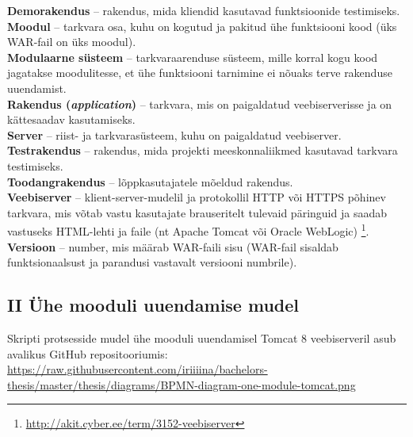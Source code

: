 \documentclass[12pt]{article}
\begin{document}
  \textbf{Demorakendus} \--- rakendus, mida kliendid kasutavad funktsioonide testimiseks.\\
  
  \textbf{Moodul} \--- tarkvara osa, kuhu on kogutud ja pakitud ühe funktsiooni kood (üks WAR\--fail on üks moodul).\\
  
  \textbf{Modulaarne süsteem} \--- tarkvaraarenduse süsteem, mille korral kogu kood jagatakse moodulitesse, et ühe funktsiooni tarnimine ei nõuaks terve rakenduse uuendamist.\\
  
  \textbf{Rakendus (\textit{application})} \--- tarkvara, mis on paigaldatud veebiserverisse ja on kättesaadav kasutamiseks.\\
  
  \textbf{Server} \--- riist- ja tarkvarasüsteem, kuhu on paigaldatud veebiserver.\\
  
  \textbf{Testrakendus} \--- rakendus, mida projekti meeskonnaliikmed kasutavad tarkvara testimiseks.\\
   
  \textbf{Toodangrakendus} \--- lõppkasutajatele mõeldud rakendus.\\
  
  \textbf{Veebiserver} \--- klient-server-mudelil ja protokollil HTTP või HTTPS põhinev tarkvara, mis võtab vastu kasutajate brauseritelt tulevaid päringuid ja saadab vastuseks HTML-lehti ja faile (nt Apache Tomcat või Oracle WebLogic) \footnote{\url{http://akit.cyber.ee/term/3152-veebiserver}}.\\
  
  \textbf{Versioon} \--- number, mis määrab WAR\--faili sisu (WAR\--fail sisaldab funktsionaalsust ja parandusi vastavalt versiooni numbrile).\\
  
  \subsection*{II Ühe mooduli uuendamise mudel}
  \label{bpmn-one}
  
  Skripti protsesside mudel ühe mooduli uuendamisel Tomcat 8 veebiserveril asub avalikus GitHub repositooriumis:\\
  \url{https://raw.githubusercontent.com/iriiiina/bachelors-thesis/master/thesis/diagrams/BPMN-diagram-one-module-tomcat.png}
  
\end{document}
